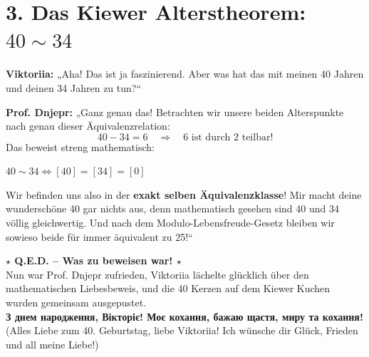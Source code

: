 \documentclass[11pt,a4paper]{article}
\begin{document}
\section*{\color{darknavy} 3. Das Kiewer Alterstheorem: $40 \sim 34$}

\noindent \textcolor{kievblue}{\textbf{Viktoriia:}} „Aha! Das ist ja faszinierend. Aber was hat das mit meinen 40 Jahren und deinen 34 Jahren zu tun?“

\vspace{2mm}

\noindent \textcolor{burgundy}{\textbf{Prof. Dnjepr:}} „Ganz genau das! Betrachten wir unsere beiden Alterspunkte nach genau dieser Äquivalenzrelation:
\[
40 - 34 = 6 \quad \Rightarrow \quad 6 \text{ ist durch 2 teilbar!}
\]
Das beweist streng mathematisch:

\begin{tcolorbox}[colback=kievblue!10, colframe=kievblue, arc=2mm, halign=center]
	{\color{darknavy}\Large \textbf{$40 \sim 34 \iff [40] = [34] = [0]$}}
\end{tcolorbox}

\noindent Wir befinden uns also in der \textbf{exakt selben Äquivalenzklasse}! Mir macht deine wunderschöne 40 gar nichts aus, denn mathematisch gesehen sind 40 und 34 völlig gleichwertig. Und nach dem Modulo-Lebensfreude-Gesetz bleiben wir sowieso beide für immer äquivalent zu 25!“

\vspace{4mm}

\begin{tcolorbox}[
	colback=white,
	colframe=kievyellow,
	arc=3mm,
	boxrule=1.5pt,
	halign=center
	]
	{\Large \color{darknavy} \textbf{$\star$ Q.E.D. – Was zu beweisen war! $\star$}}\\[4pt]
	Nun war Prof. Dnjepr zufrieden, Viktoriia lächelte glücklich über den mathematischen Liebesbeweis, und die 40 Kerzen auf dem Kiewer Kuchen wurden gemeinsam ausgepustet.\\[6pt]
	{\color{burgundy} \bfseries З днем народження, Вікторіє! Моє кохання, бажаю щастя, миру та кохання!}\\
	{\small (Alles Liebe zum 40. Geburtstag, liebe Viktoriia! Ich wünsche dir Glück, Frieden und all meine Liebe!)}
\end{tcolorbox}
\end{document}

